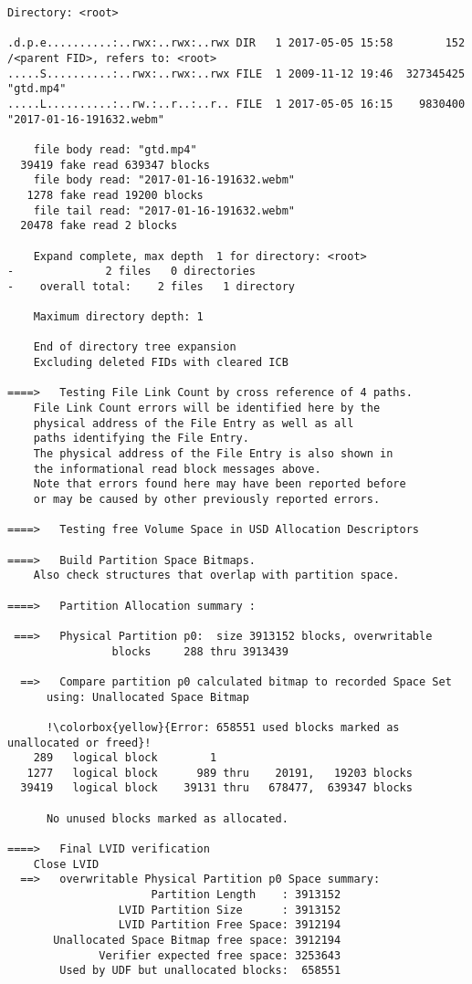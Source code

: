 \begin{lstlisting}
Directory: <root>

.d.p.e..........:..rwx:..rwx:..rwx DIR   1 2017-05-05 15:58        152 /<parent FID>, refers to: <root>
.....S..........:..rwx:..rwx:..rwx FILE  1 2009-11-12 19:46  327345425 "gtd.mp4"
.....L..........:..rw.:..r..:..r.. FILE  1 2017-05-05 16:15    9830400 "2017-01-16-191632.webm"

    file body read: "gtd.mp4"
  39419 fake read 639347 blocks
    file body read: "2017-01-16-191632.webm"
   1278 fake read 19200 blocks
    file tail read: "2017-01-16-191632.webm"
  20478 fake read 2 blocks

    Expand complete, max depth  1 for directory: <root>
-              2 files   0 directories
-    overall total:    2 files   1 directory  

    Maximum directory depth: 1

    End of directory tree expansion
    Excluding deleted FIDs with cleared ICB

====>   Testing File Link Count by cross reference of 4 paths.
    File Link Count errors will be identified here by the
    physical address of the File Entry as well as all
    paths identifying the File Entry.
    The physical address of the File Entry is also shown in
    the informational read block messages above.
    Note that errors found here may have been reported before
    or may be caused by other previously reported errors.

====>   Testing free Volume Space in USD Allocation Descriptors

====>   Build Partition Space Bitmaps.
    Also check structures that overlap with partition space.

====>   Partition Allocation summary :

 ===>   Physical Partition p0:  size 3913152 blocks, overwritable
                blocks     288 thru 3913439

  ==>   Compare partition p0 calculated bitmap to recorded Space Set
      using: Unallocated Space Bitmap

      !\colorbox{yellow}{Error: 658551 used blocks marked as unallocated or freed}!
    289   logical block        1
   1277   logical block      989 thru    20191,   19203 blocks
  39419   logical block    39131 thru   678477,  639347 blocks

      No unused blocks marked as allocated.

====>   Final LVID verification
    Close LVID
  ==>   overwritable Physical Partition p0 Space summary:
                      Partition Length    : 3913152
                 LVID Partition Size      : 3913152
                 LVID Partition Free Space: 3912194
       Unallocated Space Bitmap free space: 3912194
              Verifier expected free space: 3253643
        Used by UDF but unallocated blocks:  658551


\end{lstlisting}
